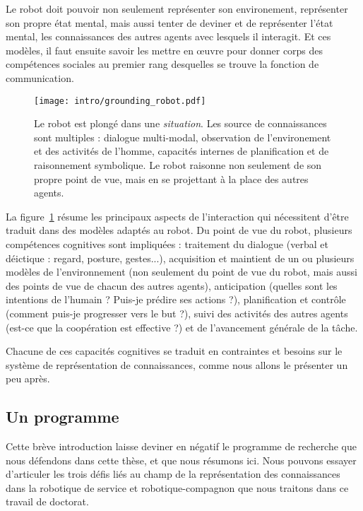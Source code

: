 Le robot doit pouvoir non seulement représenter son environement, représenter
son propre état mental, mais aussi tenter de deviner et de représenter l'état
mental, les connaissances des autres agents avec lesquels il interagit. Et ces
modèles, il faut ensuite savoir les mettre en \oe uvre pour donner corps  des
compétences sociales au premier rang desquelles se trouve la fonction de
communication.

\begin{figure}
    \centering
    \texttt{[image: intro/grounding\_robot.pdf]}
    
    \caption{Le robot est plongé dans une \emph{situation}. Les source de
    connaissances sont multiples : dialogue multi-modal, observation de
    l'environement et des activités de l'homme, capacités internes de planification
    et de raisonnement symbolique. Le robot raisonne non seulement de son propre
    point de vue, mais en se projettant à la place des autres agents.}

    \label{fig|hri-dec}
\end{figure}

La figure~\ref{fig|hri-dec} résume les principaux aspects de l'interaction qui
nécessitent d'être traduit dans des modèles adaptés au robot. Du point de vue
du robot, plusieurs compétences cognitives sont impliquées : traitement du
dialogue (verbal et déictique : regard, posture, gestes...), acquisition et
maintient de un ou plusieurs modèles de l'environnement (non seulement du point
de vue du robot, mais aussi des points de vue de chacun des autres agents),
anticipation (quelles sont les intentions de l'humain ? Puis-je prédire ses
actions ?), planification et contrôle (comment puis-je progresser vers le but
?), suivi des activités des autres agents (est-ce que la coopération est
effective ?) et de l'avancement générale de la tâche.

Chacune de ces capacités cognitives se traduit en contraintes et besoins sur le
système de représentation de connaissances, comme nous allons le présenter
un peu après.



\subsection{Un programme}
\label{sect|challenges}

Cette brève introduction laisse deviner en négatif le programme de recherche que nous
défendons dans cette thèse, et que nous résumons ici. Nous pouvons essayer
d'articuler les trois défis liés au champ de la représentation des
connaissances dans la robotique de service et robotique-compagnon que nous
traitons dans ce travail de doctorat.

